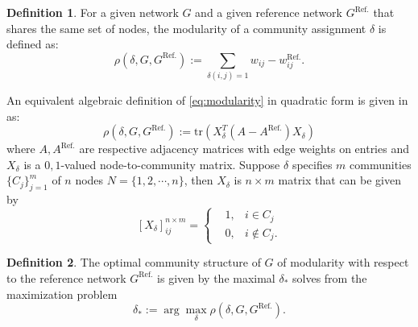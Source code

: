 \documentclass[11pt]{article}
\theoremstyle{definition}
\theoremstyle{definition}
\theoremstyle{definition}
\newtheorem{defn}{Definition}[section]
\theoremstyle{remark}
\theoremstyle{plain}
\begin{document}
\begin{defn}
	For a given network $G$ and a given reference network $G^{\text{Ref.}}$ that shares the same set of nodes, the modularity of a community assignment $\delta$ is defined as:
	\begin{equation}\label{eq:modularity}
		\rho(\delta, G, G^{\text{Ref.}}):=\sum_{\delta(i, j) = 1} w_{ij} - w_{ij}^{\text{Ref.}}.
	\end{equation}

	An equivalent algebraic definition of \eqref{eq:modularity} in quadratic form is given in \cite{fasino2016generalized} as:
	\begin{equation}\label{eq:modularity-algebraic}
		\rho(\delta, G, G^{\text{Ref.}}):= \text{tr}(X_{\delta}^T (A - A^{\text{Ref.}})X_{\delta})
	\end{equation}
	where $A, A^{\text{Ref.}}$ are respective adjacency matrices with edge weights on entries and $X_{\delta}$ is a $0,1$-valued node-to-community matrix. Suppose $\delta$ specifies $m$ communities $\{C_j\}_{j=1}^m$ of $n$ nodes $N=\{1,2,\cdots, n\}$, then $X_{\delta}$ is $n\times m$ matrix that can be given by
	\[
		[X_{\delta}]_{ij}^{n\times m} = \left\{
			\begin{aligned}
				&1, &i\in C_j\\
				&0, &i\notin C_j.
			\end{aligned}
		\right.
	\]
\end{defn}

\begin{defn}
	The optimal community structure of $G$ of modularity with respect to the reference network $G^{\text{Ref.}}$ is given by the maximal $\delta_*$ solves from the maximization problem
	\begin{equation}
		\delta_* := \arg\max_{\delta} \rho(\delta, G, G^{\text{Ref.}}).
	\end{equation}
\end{defn}




\end{document}
